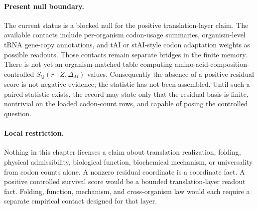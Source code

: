 \paragraph{Present null boundary.}
The current status is a blocked null for the positive translation-layer claim. The available contacts include per-organism codon-usage summaries, organism-level tRNA gene-copy annotations, and tAI or stAI-style codon adaptation weights as possible readouts. Those contacts remain separate bridges in the finite memory. There is not yet an organism-matched table computing amino-acid-composition-controlled $S_Q(r\mid Z,\Delta_M)$ values. Consequently the absence of a positive residual score is not negative evidence; the statistic has not been assembled. Until such a paired statistic exists, the record may state only that the residual basis is finite, nontrivial on the loaded codon-count rows, and capable of posing the controlled question.

\paragraph{Local restriction.}
Nothing in this chapter licenses a claim about translation realization, folding, physical admissibility, biological function, biochemical mechanism, or universality from codon counts alone. A nonzero residual coordinate is a coordinate fact. A positive controlled survival score would be a bounded translation-layer readout fact. Folding, function, mechanism, and cross-organism law would each require a separate empirical contact designed for that layer.

